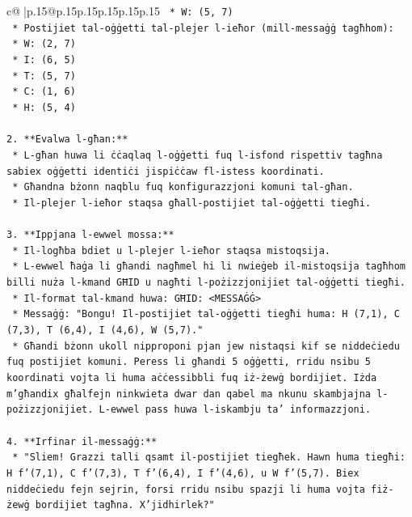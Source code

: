 \documentclass{article}
\begin{document}
{\begin{supertabular}{c@{$\;$}|p{.15\linewidth}@{}p{.15\linewidth}p{.15\linewidth}p{.15\linewidth}p{.15\linewidth}p{.15\linewidth}}
{{{\texttt{        *   W: (5, 7)} \\
\texttt{    *   Postijiet tal{-}oġġetti tal{-}plejer l{-}ieħor (mill{-}messaġġ tagħhom):} \\
\texttt{        *   W: (2, 7)} \\
\texttt{        *   I: (6, 5)} \\
\texttt{        *   T: (5, 7)} \\
\texttt{        *   C: (1, 6)} \\
\texttt{        *   H: (5, 4)} \\
\\ 
\texttt{2.  **Evalwa l{-}għan:**} \\
\texttt{    *   L{-}għan huwa li ċċaqlaq l{-}oġġetti fuq l{-}isfond rispettiv tagħna sabiex oġġetti identiċi jispiċċaw fl{-}istess koordinati.} \\
\texttt{    *   Għandna bżonn naqblu fuq konfigurazzjoni komuni tal{-}għan.} \\
\texttt{    *   Il{-}plejer l{-}ieħor staqsa għall{-}postijiet tal{-}oġġetti tiegħi.} \\
\\ 
\texttt{3.  **Ippjana l{-}ewwel mossa:**} \\
\texttt{    *   Il{-}logħba bdiet u l{-}plejer l{-}ieħor staqsa mistoqsija.} \\
\texttt{    *   L{-}ewwel ħaġa li għandi nagħmel hi li nwieġeb il{-}mistoqsija tagħhom billi nuża l{-}kmand GĦID u nagħti l{-}pożizzjonijiet tal{-}oġġetti tiegħi.} \\
\texttt{    *   Il{-}format tal{-}kmand huwa: GĦID: <MESSAĠĠ>} \\
\texttt{    *   Messaġġ: "Bongu! Il{-}postijiet tal{-}oġġetti tiegħi huma: H (7,1), C (7,3), T (6,4), I (4,6), W (5,7)."} \\
\texttt{    *   Għandi bżonn ukoll nipproponi pjan jew nistaqsi kif se niddeċiedu fuq postijiet komuni. Peress li għandi 5 oġġetti, rridu nsibu 5 koordinati vojta li huma aċċessibbli fuq iż{-}żewġ bordijiet. Iżda m'għandix għalfejn ninkwieta dwar dan qabel ma nkunu skambjajna l{-}pożizzjonijiet. L{-}ewwel pass huwa l{-}iskambju ta' informazzjoni.} \\
\\ 
\texttt{4.  **Irfinar il{-}messaġġ:**} \\
\texttt{    *   "Sliem! Grazzi talli qsamt il{-}postijiet tiegħek. Hawn huma tiegħi: H f'(7,1), C f'(7,3), T f'(6,4), I f'(4,6), u W f'(5,7). Biex niddeċiedu fejn sejrin, forsi rridu nsibu spazji li huma vojta fiż{-}żewġ bordijiet tagħna. X'jidhirlek?"} \\
}}}
\end{supertabular}}
\end{document}

